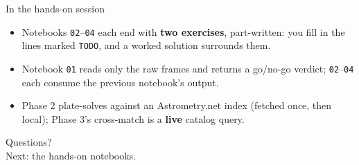 \documentclass[10pt,aspectratio=169]{beamer}
\begin{document}
\begin{frame}{In the hands-on session}
  \centering

  \vspace{1.0em}
  \begin{itemize}\footnotesize
    \item Notebooks \texttt{02}--\texttt{04} each end with \textbf{two exercises}, part-written:
          you fill in the lines marked \texttt{TODO}, and a worked solution surrounds them.
    \item Notebook \texttt{01} reads only the raw frames and returns a go/no-go verdict;
          \texttt{02}--\texttt{04} each consume the previous notebook's output.
    \item Phase 2 plate-solves against an Astrometry.net index (fetched once, then local);
          Phase 3's cross-match is a \textbf{live} catalog query.
  \end{itemize}
\end{frame}

\begin{frame}
  \centering
  \Large Questions?\\[0.5em]
  \normalsize Next: the hands-on notebooks.
\end{frame}
\end{document}
